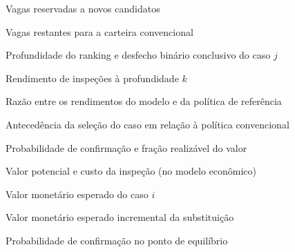 \begin{description}[labelsep=4mm,labelwidth=42mm,leftmargin=46mm,align=left]
  \item[$K_{\mathrm{novo},n}$] Vagas reservadas a novos candidatos
  \item[$K_{\mathrm{legado},n}$] Vagas restantes para a carteira convencional
  \item[$k$, $y_{(j)}$] Profundidade do ranking e desfecho binário conclusivo do caso $j$
  \item[$\mathrm{Yield}@k$] Rendimento de inspeções à profundidade $k$
  \item[$\mathrm{Lift}@k$] Razão entre os rendimentos do modelo e da política de referência
  \item[$\Delta t_i$] Antecedência da seleção do caso em relação à política convencional
  \item[$p_i$, $\theta_i$] Probabilidade de confirmação e fração realizável do valor
  \item[$V_i$, $C_i$] Valor potencial e custo da inspeção (no modelo econômico)
  \item[$\mathrm{EMV}_i$] Valor monetário esperado do caso $i$
  \item[$\Delta\mathrm{EMV}$] Valor monetário esperado incremental da substituição
  \item[$p^*$] Probabilidade de confirmação no ponto de equilíbrio
\end{description}
